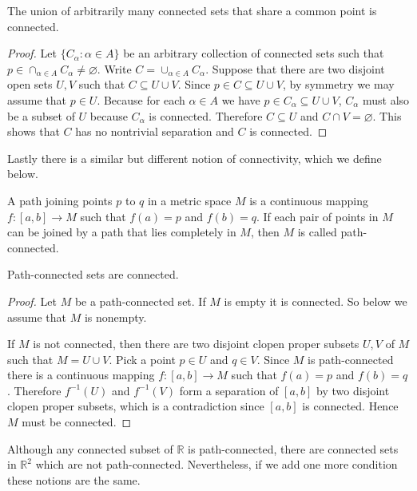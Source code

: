 \begin{thm}
  The union of arbitrarily many connected sets that share a common point is connected.
\end{thm}

\begin{proof}
  Let $\{ C_\alpha \colon \alpha \in A \}$ be an arbitrary collection of connected sets such that $p \in \cap_{\alpha \in A} C_\alpha \ne \varnothing$.
  Write $C = \cup_{\alpha \in A} C_\alpha$.
  Suppose that there are two disjoint open sets $U, V$ such that $C \subseteq U \cup V$.
  Since $p \in C \subseteq U \cup V$, by symmetry we may assume that $p \in U$.
  Because for each $\alpha \in A$ we have $p \in C_\alpha \subseteq U \cup V$, $C_\alpha$ must also be a subset of $U$ because $C_\alpha$ is connected.
  Therefore $C \subseteq U$ and $C \cap V = \varnothing$.
  This shows that $C$ has no nontrivial separation and $C$ is connected.
\end{proof}

Lastly there is a similar but different notion of connectivity, which we define below.

\begin{defn}
  A \textsf{path} joining points $p$ to $q$ in a metric space $M$ is a continuous mapping $f: [a,b] \to M$ such that $f(a) = p$ and $f(b) = q$.
  If each pair of points in $M$ can be joined by a path that lies completely in $M$, then $M$ is called \textsf{path-connected}.
\end{defn}

\begin{thm}
  Path-connected sets are connected.
\end{thm}

\begin{proof}
  Let $M$ be a path-connected set.
  If $M$ is empty it is connected.
  So below we assume that $M$ is nonempty.

  If $M$ is not connected, then there are two disjoint clopen proper subsets $U, V$ of $M$ such that $M = U \cup V$.
  Pick a point $p \in U$ and $q \in V$.
  Since $M$ is path-connected there is a continuous mapping $f: [a,b] \to M$ such that $f(a) = p$ and $f(b) = q$.
  Therefore $f^{-1}(U)$ and $f^{-1}(V)$ form a separation of $[a,b]$ by two disjoint clopen proper subsets, which is a contradiction since $[a,b]$ is connected.
  Hence $M$ must be connected.
\end{proof}

Although any connected subset of $\mathbb{R}$ is path-connected, there are connected sets in $\mathbb{R}^2$ which are not path-connected.
Nevertheless, if we add one more condition these notions are the same.

